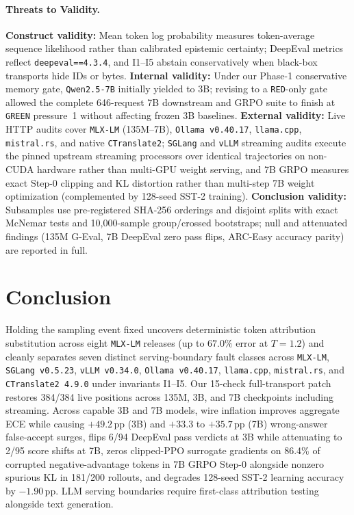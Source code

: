 \documentclass[11pt,letterpaper]{article}
\begin{document}
\paragraph{Threats to Validity.}
\textbf{Construct validity:} Mean token log probability measures token-average sequence likelihood rather than calibrated epistemic certainty; DeepEval metrics reflect \texttt{deepeval==4.3.4}, and \textsc{I1}--\textsc{I5} abstain conservatively when black-box transports hide IDs or bytes.
\textbf{Internal validity:} Under our Phase-1 conservative memory gate, \texttt{Qwen2.5-7B} initially yielded to 3B; revising to a \texttt{RED}-only gate allowed the complete 646-request 7B downstream and GRPO suite to finish at \texttt{GREEN} pressure~1 without affecting frozen 3B baselines.
\textbf{External validity:} Live HTTP audits cover \texttt{MLX-LM} (135M--7B), \texttt{Ollama v0.40.17}, \texttt{llama.cpp}, \texttt{mistral.rs}, and native \texttt{CTranslate2}; \texttt{SGLang} and \texttt{vLLM} streaming audits execute the pinned upstream streaming processors over identical trajectories on non-CUDA hardware rather than multi-GPU weight serving, and 7B GRPO measures exact Step-0 clipping and KL distortion rather than multi-step 7B weight optimization (complemented by 128-seed SST-2 training).
\textbf{Conclusion validity:} Subsamples use pre-registered SHA-256 orderings and disjoint splits with exact McNemar tests and 10,000-sample group/crossed bootstraps; null and attenuated findings (135M G-Eval, 7B DeepEval zero pass flips, ARC-Easy accuracy parity) are reported in full.

\section{Conclusion}
Holding the sampling event fixed uncovers deterministic token attribution substitution across eight \texttt{MLX-LM} releases (up to $67.0\%$ error at $T=1.2$) and cleanly separates seven distinct serving-boundary fault classes across \texttt{MLX-LM}, \texttt{SGLang v0.5.23}, \texttt{vLLM v0.34.0}, \texttt{Ollama v0.40.17}, \texttt{llama.cpp}, \texttt{mistral.rs}, and \texttt{CTranslate2 4.9.0} under invariants \textsc{I1}--\textsc{I5}. Our 15-check full-transport patch restores 384/384 live positions across 135M, 3B, and 7B checkpoints including streaming. Across capable 3B and 7B models, wire inflation improves aggregate ECE while causing $+49.2$\,pp (3B) and $+33.3$ to $+35.7$\,pp (7B) wrong-answer false-accept surges, flips 6/94 DeepEval pass verdicts at 3B while attenuating to 2/95 score shifts at 7B, zeros clipped-PPO surrogate gradients on 86.4\% of corrupted negative-advantage tokens in 7B GRPO Step-0 alongside nonzero spurious KL in 181/200 rollouts, and degrades 128-seed SST-2 learning accuracy by $-1.90$\,pp. LLM serving boundaries require first-class attribution testing alongside text generation.
\end{document}
